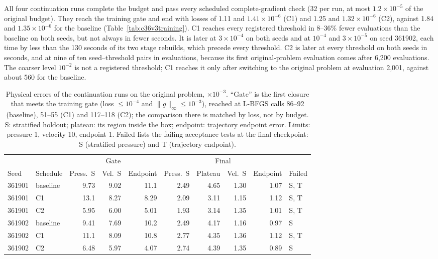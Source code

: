 \documentclass[11pt]{article}
\begin{document}
All four continuation runs complete the budget and pass every scheduled
complete-gradient check (32 per run, at most $1.2\times10^{-5}$ of the
original budget). They reach the training gate and end with losses of
1.11 and $1.41\times10^{-6}$ (C1) and 1.25 and $1.32\times10^{-6}$ (C2),
against 1.84 and $1.35\times10^{-6}$ for the baseline
(Table~\ref{tab:c36v3training}). C1 reaches every registered threshold in
8--36\% fewer evaluations than the baseline on both seeds, but not always in
fewer seconds. It is later at $3\times10^{-4}$ on both seeds and at $10^{-4}$
and $3\times10^{-5}$ on seed 361902, each time by less than the 130 seconds
of its two stage rebuilds, which precede every threshold. C2 is later at
every threshold on both seeds in seconds, and at nine of ten seed--threshold
pairs in evaluations, because its first original-problem evaluation comes
after 6,200 evaluations. The coarser level $10^{-2}$ is not a registered
threshold; C1 reaches it only after switching to the original problem at
evaluation 2,001, against about 560 for the baseline.

\begin{table}[htbp]\centering\small
\setlength{\tabcolsep}{4pt}
\caption{Physical errors of the continuation runs on the original problem, $\times10^{-3}$. ``Gate'' is the first closure that meets the training gate (loss $\le10^{-4}$ and $\|g\|_\infty\le10^{-3}$), reached at L-BFGS calls 86--92 (baseline), 51--55 (C1) and 117--118 (C2); the comparison there is matched by loss, not by budget. S: stratified holdout; plateau: its region inside the box; endpoint: trajectory endpoint error. Limits: pressure 1, velocity 10, endpoint 1. Failed lists the failing acceptance tests at the final checkpoint: S (stratified pressure) and T (trajectory endpoint).}
\label{tab:c36v3physical}
\begin{tabular}{llrrrrrrrl}\toprule
 & & \multicolumn{3}{c}{Gate} & \multicolumn{4}{c}{Final} & \\\cmidrule(lr){3-5}\cmidrule(lr){6-9}
Seed & Schedule & Press.~S & Vel.~S & Endpoint & Press.~S & Plateau & Vel.~S & Endpoint & Failed\\\midrule
361901 & baseline & 9.73 & 9.02 & 11.1 & 2.49 & 4.65 & 1.30 & 1.07 & S, T\\
361901 & C1 & 13.1 & 8.27 & 8.29 & 2.09 & 3.11 & 1.15 & 1.12 & S, T\\
361901 & C2 & 5.95 & 6.00 & 5.01 & 1.93 & 3.14 & 1.35 & 1.01 & S, T\\
361902 & baseline & 9.41 & 7.69 & 10.2 & 2.49 & 4.17 & 1.16 & 0.97 & S\\
361902 & C1 & 11.1 & 8.09 & 10.8 & 2.77 & 4.35 & 1.36 & 1.12 & S, T\\
361902 & C2 & 6.48 & 5.97 & 4.07 & 2.74 & 4.39 & 1.35 & 0.89 & S
\\\bottomrule\end{tabular}
\end{table}
\end{document}
